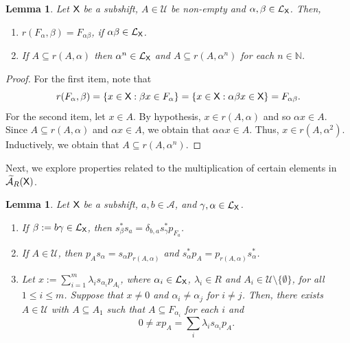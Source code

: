 \documentclass[a4paper,12pt]{amsart}
\newtheorem{lemma}[equation]{Lemma}
\theoremstyle{definition}
\theoremstyle{remark}
\numberwithin{equation}{section}
\newcommand{\osf}{{\normalfont \textsf{X}}}
\newcommand{\lang}{\CL_{\osf}}
\newcommand{\ualgshift}{\TCA_R(\osf)}
\newcommand{\alf}{\mathscr{A}}
\newcommand{\N}{\mathbb{N}}
\newcommand{\CA}{\mathcal{A}}
\newcommand{\CL}{\mathcal{L}}
\newcommand{\TCA}{\widetilde{\CA}}
\newcommand{\TCB}{\mathcal{U}}
\begin{document}
\begin{lemma}\label{relative range} Let $\osf$ be a subshift, $A\in \TCB$ be non-empty and $\alpha, \beta \in \lang$. Then,
\begin{enumerate}
[\hspace{.3cm} \rm (1)]
\item $r(F_\alpha, \beta)=F_{\alpha\beta}$, if $\alpha \beta \in \lang$. 
\item If $A\subseteq r(A,\alpha)$ then $\alpha^n \in \lang$ and $A\subseteq r(A,\alpha^n)$ for each $n\in \N$.
\end{enumerate}   
\end{lemma}
\begin{proof}
For the first item, note that
$$r(F_\alpha, \beta)=\{x\in \osf: \beta x\in F_\alpha\}=\{x\in \osf: \alpha \beta x\in \osf\}=F_{\alpha \beta}.$$
For the second item, let $x\in A$. By hypothesis, $x\in r(A,\alpha)$ and so $\alpha x\in A$. Since $A\subseteq r(A,\alpha)$ and $\alpha x\in A$, we obtain that $\alpha \alpha x \in A$. Thus, $x\in r(A, \alpha^2)$. Inductively, we obtain that $A\subseteq r(A,\alpha^n)$.

\end{proof}


Next, we explore properties related to the multiplication of certain elements in $\ualgshift$.

\begin{lemma}\label{chucrute} Let $\osf$ be a subshift, $a,b\in \alf$, and $\gamma,\alpha \in \lang$.
\begin{enumerate}[\hspace{.3cm} \rm (1)]
\item If $\beta:=b\gamma\in \lang$, then $s_\beta^*s_a=\delta_{b,a}s_\gamma^*p_{F_a}$.\vspace{.2cm}
\item If $A\in \TCB$, then $p_As_\alpha=s_\alpha p_{r(A,\alpha)}$ and $s_\alpha^*p_A=p_{r(A,\alpha)}s_\alpha^*$.
\item Let $x:=\sum\limits_{i=1}^m \lambda_i s_{\alpha_i} p_{A_i}$, where $\alpha_i\in \lang$, $\lambda_i \in R$ and $A_i\in \TCB\setminus\{\emptyset\}$, for all $1\leq i\leq m$. Suppose that $x\neq 0$ and $\alpha_i\neq  \alpha_j$ for $i\neq j$. Then, there exists $A\in \TCB$ with $A\subseteq A_1$ such that $A\subseteq F_{\alpha_i}$ for each $i$ and  $$0\neq xp_A=\sum\limits_i \lambda_i s_{\alpha_i}p_A.$$
\end{enumerate}
\end{lemma}
\end{document}
